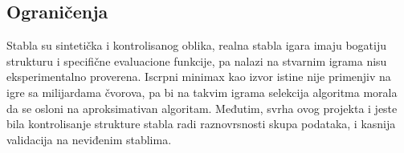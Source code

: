 \documentclass[12pt, a4paper]{article}
\begin{document}
\subsection{Ograničenja}

Stabla su sintetička i kontrolisanog oblika, realna stabla igara imaju bogatiju
strukturu i specifične evaluacione funkcije, pa nalazi na stvarnim
igrama nisu eksperimentalno proverena. Iscrpni minimax kao izvor istine nije primenjiv na igre
sa milijardama čvorova, pa bi na takvim igrama selekcija algoritma morala da se osloni na
aproksimativan algoritam. Međutim, svrha ovog projekta i jeste bila kontrolisanje strukture stabla
radi raznovrsnosti skupa podataka, i kasnija validacija na neviđenim stablima.
\end{document}
